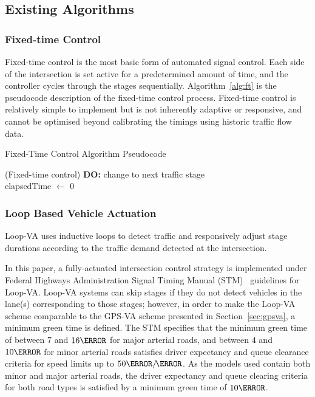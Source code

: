 \documentclass[numbered]{trbunofficial}
\newcommand{\sidiv}{/\hspace{-1.5pt}} %
\begin{document}
\subsection{Existing Algorithms}
\subsubsection{Fixed-time Control}
Fixed-time control is the most basic form of automated signal control. Each side of the intersection is set active for a predetermined amount of time, and the controller cycles through the stages sequentially. Algorithm~\ref{alg:ft} is the pseudocode description of the fixed-time control process. Fixed-time control is relatively simple to implement but is not inherently adaptive or responsive, and cannot be optimised beyond calibrating the timings using historic traffic flow data.


\begin{algorithm}[h]
	\caption{Fixed-Time Control Algorithm Pseudocode}
	\label{alg:ft}
	\SetAlgoVlined
	\SetVlineSkip{3pt}
	\Begin(Fixed-time control){
		{ 
			\textbf{DO:} change to next traffic stage\\
			elapsedTime $\gets$ 0
		}
	}
\end{algorithm}

\subsubsection{Loop Based Vehicle Actuation} \label{sec:va}
Loop-VA uses inductive loops \cite{Yauch1990} to detect traffic and responsively adjust stage durations according to the traffic demand detected at the intersection.

In this paper, a fully-actuated intersection control strategy is implemented under Federal Highways Administration Signal Timing Manual (STM)~\cite{theSTM2008} guidelines for Loop-VA. Loop-VA systems can skip stages if they do not detect vehicles in the lane(s) corresponding to those stages; however, in order to make the Loop-VA scheme comparable to the GPS-VA scheme presented in Section~\ref{sec:gpsva}, a minimum green time is defined. 
The STM specifies that the minimum green time of between $7$ and $16\s$ for major arterial roads, and between $4$ and $10\s$ for minor arterial roads satisfies driver expectancy and queue clearance criteria for speed limits up to $50\km\sidiv\hour$. As the models used contain both minor and major arterial roads, the driver expectancy and queue clearing criteria for both road types is satisfied by a minimum green time of $10\s$.
\end{document}
